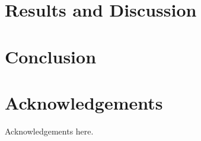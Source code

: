 \documentclass[letterpaper]{article}
\begin{document}
\section{Results and Discussion}



\section{Conclusion}






\section{Acknowledgements}

Acknowledgements here.


\footnotesize

\end{document}
